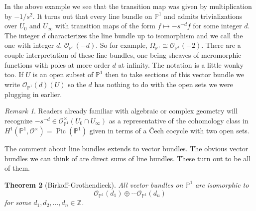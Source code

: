 \documentclass[12pt]{book}
\numberwithin{equation}{section}
\newtheorem{theorem}{Theorem}[subsection]
\theoremstyle{definition}
\theoremstyle{remark}
\newtheorem{remark}[theorem]{Remark}
\newcommand{\ZZ}{\mathbb{Z}}
\newcommand{\PP}{\mathbb{P}}
\newcommand{\Ocal}{\mathcal{O}}
\newcommand{\Pic}{\operatorname{Pic}}
\begin{document}
In the above example we see that the transition map was given by multiplication by $-1/s^2$. 
It turns out that every line bundle on $\PP^1$ and admits trivializations over $U_0$ and $U_{\infty}$ with transition maps of  the form $f \mapsto -s^{-d} f$ for some integer $d$. 
The integer $d$ characterizes the line bundle up to isomorphism and we call the one with integer $d$, $\Ocal_{\PP^1}(-d)$. 
So for example, $\Omega_{\PP^1} \cong \Ocal_{\PP^1}(-2)$. 
There are a couple interpretation of these line bundles, one being sheaves of meromorphic functions with poles at more order $d$ at infinity. 
The notation is a little wonky too. 
If $U$ is an open subset of $\PP^1$ then to take sections of this vector bundle we write $\Ocal_{\PP^1}(d)(U)$ so the $d$ has nothing to do with the open sets we were plugging in earlier. 
\begin{remark}
	Readers already familiar with algebraic or complex geometry will recognize $-s^{-d} \in \Ocal^{\times}_{\PP^1}(U_0 \cap U_{\infty})$ as a representative of the cohomology class  in $H^1(\PP^1,\Ocal^{\times}) = \Pic(\PP^1)$ given in terms of a \v{C}ech cocycle with two open sets. 
\end{remark}
The comment about line bundles extends to vector bundles. 
The obvious vector bundles we can think of are direct sums of line bundles. 
These turn out to be all of them.

\begin{theorem}[Birkoff-Grothendieck]
	All vector bundles on $\PP^1$ are isomorphic to 
	$$ \Ocal_{\PP^1}(d_1) \oplus \cdots \Ocal_{\PP^1}(d_n) $$
	for some $d_1,d_2,\ldots,d_n \in \ZZ$.
\end{theorem}

\end{document}

